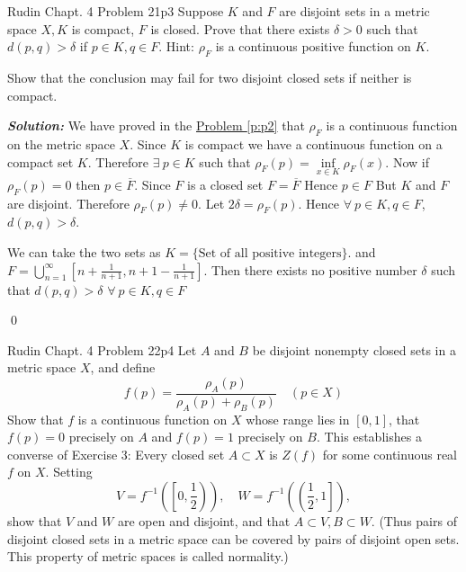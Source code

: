 \documentclass[a4paper, 11pt]{article}
\newcommand{\Qed}{\begin{flushright}\qed\end{flushright}}
\newcommand{\sol}[1]{\begin{solution}#1\end{solution}\Qed}
\newenvironment{solution}
{\textbf{\textit{Solution:}}\setlength{\parindent}{1cm}}
{}
\begin{document}
	
	
	\begin{problem}{Rudin Chapt. 4 Problem 21}{p3}
		Suppose $K$ and $F$ are disjoint sets in a metric space $X, K$ is compact, $F$ is closed. Prove that there exists $\delta>0$ such that $d(p, q)>\delta$ if $p \in K, q \in F$. Hint: $\rho_{F}$ is a continuous positive function on $K$.
		
		\hspace{1cm}Show that the conclusion may fail for two disjoint closed sets if neither is compact.
	\end{problem}
	
	\sol{
We have proved in the \hyperref[p:p2]{Problem \ref{p:p2}} that $\rho_F$ is a continuous function on the metric space $X$. Since $K$ is compact we have a continuous function on a compact set $K$. Therefore $\exists\ p\in K$ such that $\rho_F(p)=\inf\limits_{x\in K}\rho_F(x)$. Now if $\rho_F(p)=0$ then $p\in \overline{F}$. Since $F$ is a closed set $F=\overline{F}$ Hence $p\in F$ But $K$ and $F$ are disjoint. Therefore $\rho_F(p)\neq 0$. Let $2\delta=\rho_F(p)$. Hence $\forall\ p\in K,q\in F$, $d(p,q)>\delta$.

We can take the two sets as $K=\{\text{Set of all positive integers}\}$. and $F=\bigcup\limits_{n=1}^{\infty}\left[n+\frac{1}{n+1},n+1-\frac1{n+1}\right]$. Then there exists no positive number $\delta $ such that $d(p,q)>\delta$ $\forall\ p\in K,q\in F$
}
	
	
	
	\begin{problem}{Rudin Chapt. 4 Problem 22}{p4}
		Let $A$ and $B$ be disjoint nonempty closed sets in a metric space $X$, and define$$		f(p)=\frac{\rho_{A}(p)}{\rho_{A}(p)+\rho_{B}(p)} \quad(p \in X)$$Show that $f$ is a continuous function on $X$ whose range lies in $[0,1]$, that $f(p)=0$ precisely on $A$ and $f(p)=1$ precisely on $B$. This establishes a converse of Exercise 3: Every closed set $A \subset X$ is $Z(f)$ for some continuous real $f$ on $X$. Setting$$V=f^{-1}\left(\left[0, \frac{1}{2}\right)\right), \quad W=f^{-1}\left(\left(\frac{1}{2}, 1\right]\right),$$		show that $V$ and $W$ are open and disjoint, and that $A \subset V, B \subset W$. (Thus pairs of disjoint closed sets in a metric space can be covered by pairs of disjoint open sets. This property of metric spaces is called normality.)
	\end{problem}
	
\end{document}
